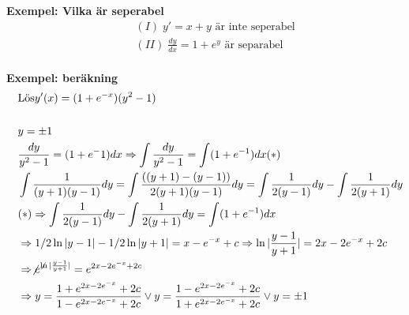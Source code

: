 \textbf{Exempel: Vilka är seperabel}
\begin{align*}
  &\quad  (I) \; y'=x+y \text{ är inte seperabel}  \\
  &\quad  (II) \; \frac{dy}{dx} = 1 + e^y \text{ är separabel} \\ 
\end{align*}

\textbf{Exempel: beräkning}  
\begin{align*}
  &\quad  \text{Lös} y'(x)=(1+e^{-x})(y^2-1) \\
  &\quad  \\
  &\quad  y=\pm1 \\
  &\quad  \frac{dy}{y^2-1}=(1+e^-1)dx  \Rightarrow \int \frac{dy}{y^2-1}= \int (1+e^{-1})dx (*)\\
  &\quad  \int \frac{1}{(y+1)(y-1)}dy = \int \frac{((y+1)-(y-1))}{2(y+1)(y-1)}dy
  = \int \frac{1}{2(y-1)}dy - \int \frac{1}{2(y+1)}dy \\
  &\quad  (*) \Rightarrow  \int \frac{1}{2(y-1)}dy - \int \frac{1}{2(y+1)}dy = \int (1+e^{-1})dx \\
  &\quad  \Rightarrow 1/2 \ln|y-1| - 1/2 \ln|y+1| = x-e^{-x} +c
  \Rightarrow \ln|\frac{y-1}{y+1}| = 2x-2e^{-x}+2c \\
  &\quad  \Rightarrow \not{e}^{\not\ln|\frac{y-1}{y+1}|} = e^{2x-2e^{-x}+2c} \\
  &\quad  \Rightarrow y = \frac{1+e^{2x-2e^{-x}}+2c}{{1-e^{2x-2e^{-x}}+2c}} \lor
  y=\frac{1-e^{2x-2e^{-x}}+2c}{{1+e^{2x-2e^{-x}}+2c}} \lor y=\pm1
\end{align*}


\newpage


